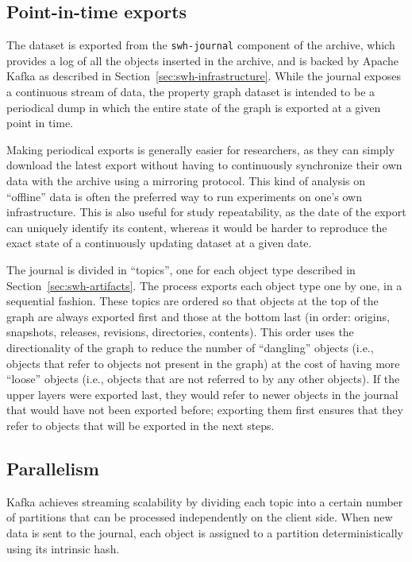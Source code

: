 \subsection{Point-in-time exports}

The dataset is exported from the \texttt{swh-journal} component of the archive,
which provides a log of all the objects inserted in the archive, and is backed
by Apache Kafka as described in Section~\ref{sec:swh-infrastructure}. While the
journal exposes a continuous stream of data, the property graph dataset is
intended to be a periodical dump in which the entire state of the graph is
exported at a given point in time.

Making periodical exports is generally easier for researchers, as they can
simply download the latest export without having to continuously synchronize
their own data with the archive using a mirroring protocol. This kind of
analysis on ``offline'' data is often the preferred way to run experiments on
one's own infrastructure. This is also useful for study repeatability, as the
date of the export can uniquely identify its content, whereas it would be
harder to reproduce the exact state of a continuously updating dataset at a
given date.

The journal is divided in ``topics'', one for each object type described
in Section~\ref{sec:swh-artifacts}. The process exports each object type one by
one, in a sequential fashion. These topics are ordered so that objects at the
top of the graph are always exported first and those at the bottom last (in
order: origins, snapshots, releases, revisions, directories, contents). This
order uses the directionality of the graph to reduce the number of ``dangling''
objects (i.e., objects that refer to objects not present in the graph) at the
cost of having more ``loose'' objects (i.e., objects that are not referred to
by any other objects). If the upper layers were exported last, they would refer
to newer objects in the journal that would have not been exported before;
exporting them first ensures that they refer to objects that will be exported
in the next steps.

\subsection{Parallelism}

Kafka achieves streaming scalability by dividing each topic into a certain
number of partitions that can be processed independently on the client side.
When new data is sent to the journal, each object is assigned to a partition
deterministically using its intrinsic hash.

